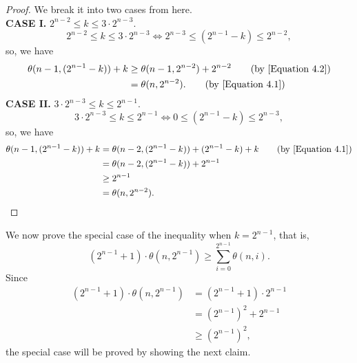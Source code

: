 \documentclass[12pt]{ucthesis}
\theoremstyle{plain}
\theoremstyle{definition}
\begin{document}
\begin{proof}
We break it into two cases from here. \\
\textbf{CASE I.} $2^{n - 2} \le k \le 3 \cdot 2^{n - 3}$.
\begin{equation*}
2^{n - 2} \le k \le 3 \cdot 2^{n - 3} \iff 2^{n - 3} \le (2^{n - 1} - k) \le 2^{n - 2},
\end{equation*}
so, we have
\begin{align*}
\theta(n - 1, (2^{n - 1} - k)) + k
& \ge \theta(n - 1, 2^{n - 2}) + 2^{n - 2} \tag{by \ref{Equation 4.2}} \\
& = \theta(n, 2^{n - 2}). \tag{by \ref{Equation 4.1}}
\end{align*}
\textbf{CASE II.} $3 \cdot 2^{n - 3} \le k \le 2^{n - 1}$.
\begin{equation*}
3 \cdot 2^{n - 3} \le k \le 2^{n - 1} \iff 0 \le (2^{n - 1} - k) \le 2^{n - 3},
\end{equation*}
so, we have
\begin{align*}
\theta(n - 1, (2^{n - 1} - k)) + k
& = \theta(n - 2, (2^{n - 1} - k)) + (2^{n - 1} - k) + k \tag{by \ref{Equation 4.1}} \\
& = \theta(n - 2, (2^{n - 1} - k)) + 2^{n - 1} \\
& \ge 2^{n - 1} \\
& = \theta(n, 2^{n - 2}).
\end{align*}
\end{proof}

We now prove the special case of the inequality when $k = 2^{n - 1}$, that is,
\begin{equation*}
(2^{n - 1} + 1) \cdot \theta(n, 2^{n - 1}) \ge \sum_{i = 0}^{2^{n - 1}} \theta(n, i).
\end{equation*}
Since
\begin{align*}
(2^{n - 1} + 1) \cdot \theta(n, 2^{n - 1})
& = (2^{n - 1} + 1) \cdot 2^{n - 1} \\
& = (2^{n - 1})^2 + 2^{n - 1} \\
& \ge (2^{n - 1})^2,
\end{align*}
the special case will be proved by showing the next claim.
\end{document}
